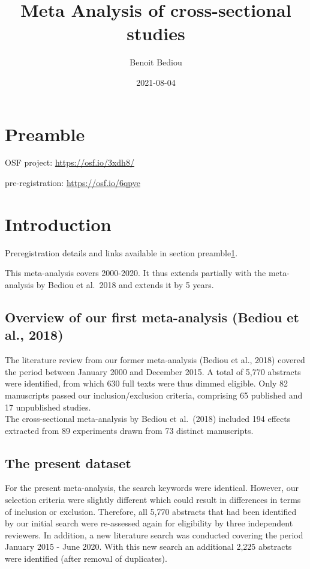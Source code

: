\documentclass[
]{book}
\title{Meta Analysis of cross-sectional studies}
\author{Benoit Bediou}
\date{2021-08-04}
\begin{document}
\maketitle

{
\setcounter{tocdepth}{1}
\tableofcontents
}
\hypertarget{preamble}{%
\chapter{Preamble}\label{preamble}}

OSF project: \url{https://osf.io/3xdh8/}

pre-registration: \url{https://osf.io/6qpye}

\hypertarget{intro}{%
\chapter{Introduction}\label{intro}}

Preregistration details and links available in section preamble\ref{preamble}.

This meta-analysis covers 2000-2020. It thus extends partially with the meta-analysis
by Bediou et al.~2018 and extends it by 5 years.

\hypertarget{overview-of-our-first-meta-analysis-bediou-et-al.-2018}{%
\section{Overview of our first meta-analysis (Bediou et al., 2018)}\label{overview-of-our-first-meta-analysis-bediou-et-al.-2018}}

The literature review from our former meta-analysis (Bediou et al., 2018) covered the period between
January 2000 and December 2015. A total of 5,770 abstracts were identified, from which 630 full texts
were thus dimmed eligible. Only 82 manuscripts passed our inclusion/exclusion criteria, comprising
65 published and 17 unpublished studies.\\
The cross-sectional meta-analysis by Bediou et al.~(2018) included 194 effects extracted
from 89 experiments drawn from 73 distinct manuscripts.

\hypertarget{the-present-dataset}{%
\section{The present dataset}\label{the-present-dataset}}

For the present meta-analysis, the search keywords were identical. However, our selection criteria were
slightly different which could result in differences in terms of inclusion or exclusion. Therefore,
all 5,770 abstracts that had been identified by our initial search were re-assessed again for eligibility
by three independent reviewers.
In addition, a new literature search was conducted covering the period January 2015 - June 2020. With this
new search an additional 2,225 abstracts were identified (after removal of duplicates).
\end{document}
